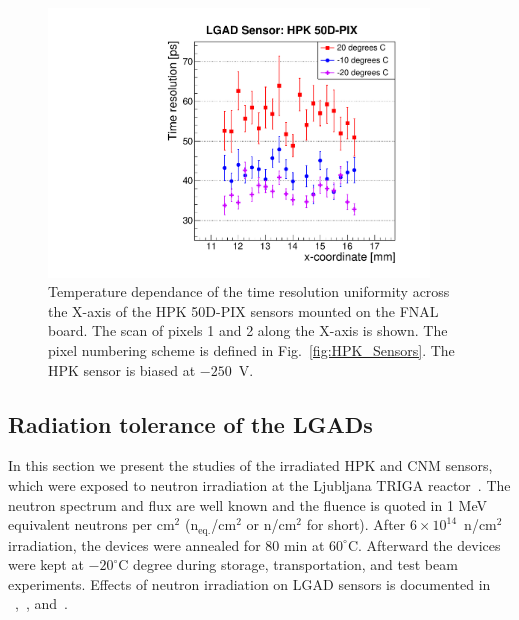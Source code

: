 \documentclass[preprint,1p]{elsarticle}
\begin{document}
\begin{figure}[htbp] 
\centering
\includegraphics[width=0.9\textwidth]{figs/FNAL_TimeResolution_vs_X_HPK50D_TemperatureDependance.pdf} 
\caption{Temperature dependance of the time resolution uniformity across the
X-axis of the HPK 50D-PIX sensors mounted on the FNAL board. The scan of pixels
1 and 2 along the X-axis is shown. The pixel numbering scheme is defined in
Fig.~\ref{fig:HPK_Sensors}. The HPK sensor is biased at $-250$~V.} 
\label{fig:TimeResolution_vs_X_HPK50D_TemperatureDependance} 
\end{figure} 




\subsection{Radiation tolerance of the LGADs}
\label{sec:rad_tolerance}

In this section we present the studies of the irradiated HPK and CNM sensors,
which were exposed to neutron irradiation at the Ljubljana TRIGA reactor~\cite{SNOJ2012483}. The
neutron spectrum and flux are well known and the fluence is quoted in 1 MeV
equivalent neutrons per cm$^2$ (n$_{\mathrm{eq.}}$/cm$^2$ or 
n/cm$^2$ for short). After $6\times 10^{14}$~n/cm$^2$ irradiation, the devices
were
annealed for 80 min at $60^{\circ}$C. Afterward the devices were kept at
$-20^{\circ}$C degree during storage, transportation, and test beam experiments.
Effects of neutron irradiation on LGAD sensors is documented in
~\cite{Galloway:2017gfx},~\cite{4DTracking}, and~\cite{Kramberger}.
\end{document}
